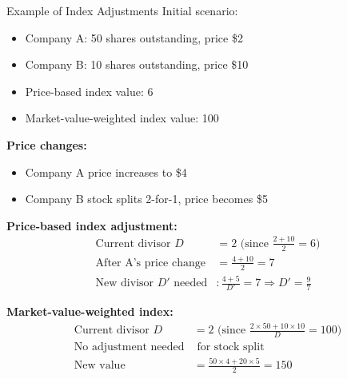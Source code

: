 \documentclass[10pt,handout]{beamer}
\begin{document}
\begin{frame}{Example of Index Adjustments}
  Initial scenario:
  \begin{itemize}
    \item Company A: 50 shares outstanding, price \$2
    \item Company B: 10 shares outstanding, price \$10
    \item Price-based index value: 6
    \item Market-value-weighted index value: 100
  \end{itemize}
  
  \pause
  \textbf{Price changes:}
  \begin{itemize}
    \item Company A price increases to \$4
    \item Company B stock splits 2-for-1, price becomes \$5
  \end{itemize}
  
  \pause
  \textbf{Price-based index adjustment:}
  \begin{align*}
    \text{Current divisor } D &= 2 \text{ (since } \tfrac{2 + 10}{2} = 6)\\
    \text{After A's price change} &= \tfrac{4 + 10}{2} = 7\\
    \text{New divisor } D' \text{ needed} &: \tfrac{4 + 5}{D'} = 7 \Rightarrow D' = \tfrac{9}{7}
  \end{align*}
  
  \pause
  \textbf{Market-value-weighted index:}
  \begin{align*}
    \text{Current divisor } D &= 2 \text{ (since } \tfrac{2 \times 50 + 10 \times 10}{D} = 100)\\
    \text{No adjustment needed} &\text{ for stock split}\\
    \text{New value} &= \tfrac{50 \times 4 + 20 \times 5}{2} = 150
  \end{align*}
\end{frame}
\end{document}
